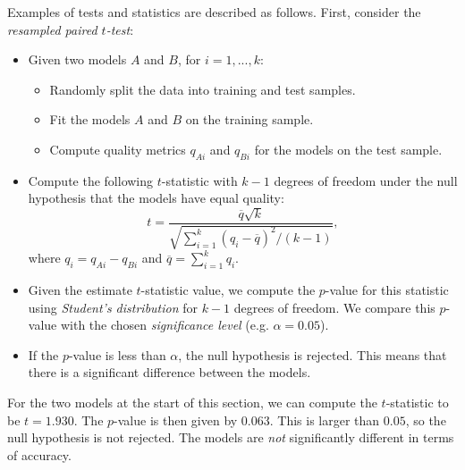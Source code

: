 \newpage
Examples of tests and statistics are described as follows. First, consider the \textit{resampled paired $t$-test}:
\begin{itemize}
\item Given two models $A$ and $B$, for $i=1,...,k$:
\begin{itemize}
\item Randomly split the data into training and test samples.
\item Fit the models $A$ and $B$ on the training sample.
\item Compute quality metrics $q_{Ai}$ and $q_{Bi}$ for the models on the test sample.
\end{itemize}
\item Compute the following $t$-statistic with $k-1$ degrees of freedom under the null hypothesis that the models have equal quality:
\begin{equation*}
t = \frac{\overline{q} \sqrt{k}}{\sqrt{\displaystyle \sum_{i=1}^{k} (q_i - \overline{q})^2 / (k-1)}},
\end{equation*} 
where $q_i = q_{Ai} - q_{Bi}$ and $\overline{q} = \displaystyle \sum_{i=1}^{k} q_i$. 
\item Given the estimate $t$-statistic value, we compute the $p$-value for this statistic using \textit{Student's distribution} for $k-1$ degrees of freedom. We compare this $p$-value with the chosen \textit{significance level} (e.g. $\alpha = 0.05$).
\item If the $p$-value is less than $\alpha$, the null hypothesis is rejected. This means that there is a significant difference between the models.
\end{itemize}

\begin{frameex}
For the two models at the start of this section, we can compute the $t$-statistic to be $t = 1.930$. The $p$-value is then given by $0.063$. This is larger than $0.05$, so the null hypothesis is not rejected. The models are \textit{not} significantly different in terms of accuracy.
\end{frameex}

\minirule

